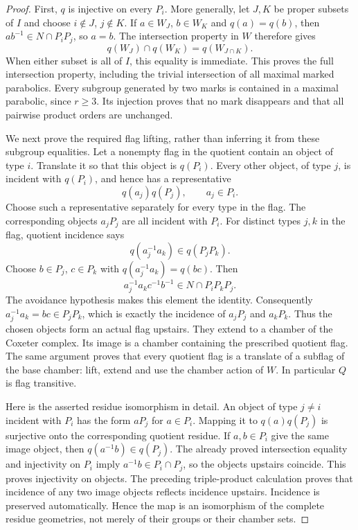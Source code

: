 \documentclass[11pt,a4paper]{article}
\begin{document}
\begin{proof}
First, $q$ is injective on every $P_i$. More generally, let $J,K$
be proper subsets of $I$ and choose $i\notin J$, $j\notin K$.
If $a\in W_J$, $b\in W_K$ and $q(a)=q(b)$, then
$ab^{-1}\in N\cap P_iP_j$, so $a=b$. The intersection property
in $W$ therefore gives
\[
 q(W_J)\cap q(W_K)=q(W_{J\cap K}).
\]
When either subset is all of $I$, this equality is immediate.
This proves the full intersection property, including the trivial
intersection of all maximal marked parabolics. Every subgroup
generated by two marks is contained in a maximal parabolic, since
$r\ge3$. Its injection proves that no mark disappears and that all
pairwise product orders are unchanged.

We next prove the required flag lifting, rather than inferring it
from these subgroup equalities. Let a nonempty flag in the quotient
contain an object of type $i$. Translate it so that this object is
$q(P_i)$. Every other object, of type $j$, is incident with
$q(P_i)$, and hence has a representative
\[
                         q(a_j)q(P_j),\qquad a_j\in P_i.
\]
Choose such a representative separately for every type in the flag.
The corresponding objects $a_jP_j$ are all incident with $P_i$.
For distinct types $j,k$ in the flag, quotient incidence says
\[
 q(a_j^{-1}a_k)\in q(P_jP_k).
\]
Choose $b\in P_j$, $c\in P_k$ with
$q(a_j^{-1}a_k)=q(bc)$. Then
\[
        a_j^{-1}a_kc^{-1}b^{-1}\in N\cap P_iP_kP_j.
\]
The avoidance hypothesis makes this element the identity. Consequently
$a_j^{-1}a_k=bc\in P_jP_k$, which is exactly the incidence of
$a_jP_j$ and $a_kP_k$. Thus the chosen objects form an actual flag
upstairs. They extend to a chamber of the Coxeter complex. Its image
is a chamber containing the prescribed quotient flag.
The same argument proves that every quotient flag is a translate of
a subflag of the base chamber: lift, extend and use the chamber action
of $W$. In particular $Q$ is flag transitive.

Here is the asserted residue isomorphism in detail. An object of type
$j\ne i$ incident with $P_i$ has the form $aP_j$ for $a\in P_i$.
Mapping it to $q(a)q(P_j)$ is surjective onto the corresponding
quotient residue. If $a,b\in P_i$ give the same image object, then
$q(a^{-1}b)\in q(P_j)$. The already proved intersection equality
and injectivity on $P_i$ imply
$a^{-1}b\in P_i\cap P_j$, so the objects upstairs coincide.
This proves injectivity on objects. The preceding triple-product
calculation proves that incidence of any two image objects reflects
incidence upstairs. Incidence is preserved automatically. Hence the
map is an isomorphism of the complete residue geometries, not merely
of their groups or their chamber sets.


\end{proof}
\end{document}
